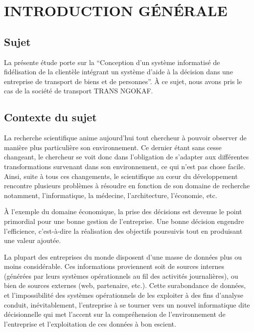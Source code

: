 \chapter*{INTRODUCTION GÉNÉRALE}
    \section[Sujet]{Sujet}
    La présente étude porte sur la \enquote{Conception d’un système informatisé
    de fidélisation de la clientèle intégrant un système d’aide à la décision
    dans une entreprise de transport de biens et de personnes}.
    À ce sujet, nous avons pris le cas de la société de transport TRANS NGOKAF.
    
    \section[Contexte du sujet]{Contexte du sujet}
    La recherche scientifique anime aujourd’hui tout chercheur
    à pouvoir observer de manière
    plus particulière son environnement. Ce dernier étant
    sans cesse changeant, le chercheur se voit donc
    dans l’obligation de s’adapter aux différentes transformations
    survenant dans son environnement, ce qui n’est pas chose facile.
    Ainsi, suite à tous ces changements, le scientifique au cœur du
    développement rencontre plusieurs problèmes à résoudre en
    fonction de son domaine de recherche notamment, l’informatique,
    la médecine, l’architecture, l’économie, etc.
    \newline

    À l’exemple du domaine
    économique, la prise des décisions est devenue
    le point primordial pour une bonne gestion de
    l’entreprise. Une bonne décision engendre l’efficience,
    c’est-à-dire la réalisation des objectifs
    poursuivis tout en produisant une valeur ajoutée.
    \newline

    La plupart des entreprises du monde disposent d’une masse de données plus ou
    moins considérable. Ces informations proviennent soit de sources internes (générées par
    leurs systèmes opérationnels au fil des activités journalières), ou bien de sources externes
    (web, partenaire, etc.). Cette surabondance de données, et l’impossibilité des systèmes
    opérationnels de les exploiter à des fins d’analyse conduit, inévitablement, l’entreprise à se
    tourner vers un nouvel informatique dite décisionnelle qui met l’accent sur la
    compréhension de l’environnement de l’entreprise et l’exploitation de ces données à bon
    escient.
    \newline

